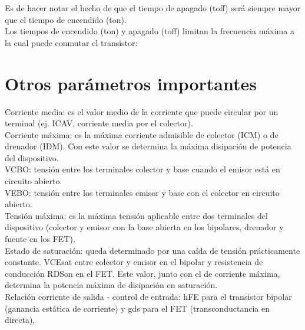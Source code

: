 \documentclass[10pt,a4paper]{article}
\begin{document}
\raggedright
Es de hacer notar el hecho de que el tiempo de apagado (toff) será siempre mayor que el tiempo de encendido (ton).\\
Los tiempos de encendido (ton) y apagado (toff) limitan la frecuencia máxima a la cual puede conmutar el transistor:


\section{Otros parámetros importantes}
Corriente media: es el valor medio de la corriente que puede circular por un terminal (ej. ICAV, corriente media por el colector).\\
\bigskip
Corriente máxima: es la máxima corriente admisible de colector (ICM) o de drenador (IDM). Con este valor se determina la máxima disipación de potencia del dispositivo.\\
VCBO: tensión entre los terminales colector y base cuando el emisor está en circuito abierto.\\
VEBO: tensión entre los terminales emisor y base con el colector en circuito abierto.\\
\bigskip
Tensión máxima: es la máxima tensión aplicable entre dos terminales del dispositivo (colector y emisor con la base abierta en los bipolares, drenador y fuente en los FET).\\
\bigskip
Estado de saturación: queda determinado por una caída de tensión prácticamente constante. VCEsat entre colector y emisor en el bipolar y resistencia de conducción RDSon en el FET. Este valor, junto con el de corriente máxima, determina la potencia máxima de disipación en saturación.\\
\bigskip
Relación corriente de salida - control de entrada: hFE para el transistor bipolar (ganancia estática de corriente) y gds para el FET (transconductancia en directa).
\end{document}
